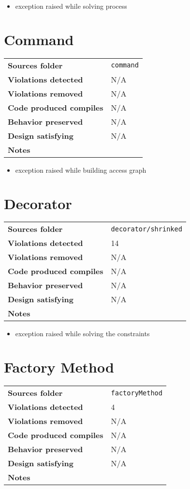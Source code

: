\documentclass[french]{article}
\begin{document}
\begin{itemize}
\item exception raised while solving process
\end{itemize}

\section*{Command}
\noindent\begin{tabular}{ l p{12cm} }
\textbf{Sources folder} &  \texttt{command}\\
\textbf{Violations detected} & N/A\\
\textbf{Violations removed} & N/A\\
\textbf{Code produced compiles} & N/A\\
\textbf{Behavior preserved} & N/A \\
\textbf{Design satisfying} & N/A\\
\textbf{Notes} & \\
\end{tabular}

\begin{itemize}
\item exception raised while building access graph
\end{itemize}
			

\section*{Decorator}
\noindent\begin{tabular}{ l p{12cm} }
\textbf{Sources folder} &  \texttt{decorator/shrinked}\\
\textbf{Violations detected} & 14\\
\textbf{Violations removed} & N/A\\
\textbf{Code produced compiles} & N/A\\
\textbf{Behavior preserved} & N/A \\
\textbf{Design satisfying} & N/A\\
\textbf{Notes} & \\
\end{tabular}

\begin{itemize}
\item exception raised while solving the constraints
\end{itemize}

\section*{Factory Method}
\noindent\begin{tabular}{ l p{12cm} }
\textbf{Sources folder} &  \texttt{factoryMethod}\\
\textbf{Violations detected} & 4\\
\textbf{Violations removed} & N/A\\
\textbf{Code produced compiles} & N/A\\
\textbf{Behavior preserved} & N/A \\
\textbf{Design satisfying} & N/A\\
\textbf{Notes} & \\
\end{tabular}
\end{document}
